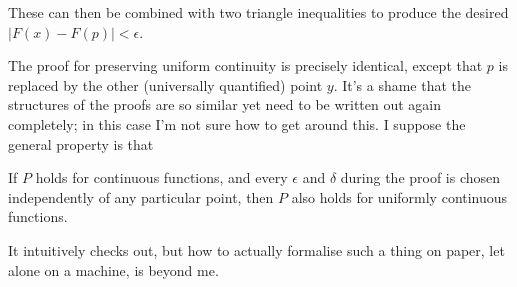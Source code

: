 \documentclass[a4paper, twoside, 11pt]{article}
\theoremstyle{definition}
\theoremstyle{plain}
\theoremstyle{remark}
\begin{document}
These can then be combined with two triangle inequalities to produce the desired $|F(x) - F(p)| < \epsilon$.

The proof for preserving uniform continuity is precisely identical, except that $p$ is replaced by the other (universally quantified) point $y$. It's a shame that the structures of the proofs are so similar yet need to be written out again completely; in this case I'm not sure how to get around this. I suppose the general property is that

\begin{center}
If $P$ holds for continuous functions, and every $\epsilon$ and $\delta$ during the proof is chosen independently of any particular point, then $P$ also holds for uniformly continuous functions.
\end{center}

It intuitively checks out, but how to actually formalise such a thing on paper, let alone on a machine, is beyond me.
\end{document}
